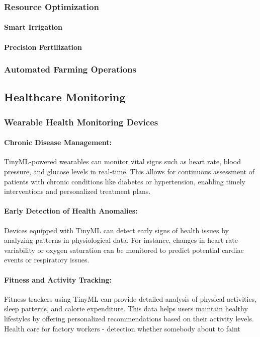 \documentclass[twocolumn]{article}
\begin{document}
\subsubsection{Resource Optimization}
\paragraph{Smart Irrigation}
\paragraph{Precision Fertilization}

\subsubsection{Automated Farming Operations}



\subsection{Healthcare Monitoring}

\subsubsection{Wearable Health Monitoring Devices}
\paragraph{Chronic Disease Management:}TinyML-powered wearables can monitor vital signs such as heart rate, blood pressure, and glucose levels in real-time. This allows for continuous assessment of patients with chronic conditions like diabetes or hypertension, enabling timely interventions and personalized treatment plans.
\paragraph{Early Detection of Health Anomalies:}Devices equipped with TinyML can detect early signs of health issues by analyzing patterns in physiological data. For instance, changes in heart rate variability or oxygen saturation can be monitored to predict potential cardiac events or respiratory issues.
\paragraph{Fitness and Activity Tracking:}
Fitness trackers using TinyML can provide detailed analysis of physical activities, sleep patterns, and calorie expenditure. This data helps users maintain healthy lifestyles by offering personalized recommendations based on their activity levels.
Health care for factory workers - detection whether somebody about to faint
\end{document}
